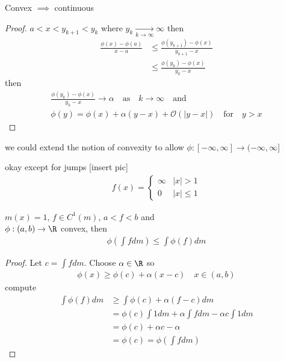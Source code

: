 \begin{lemma}
	Convex $\implies$ continuous
\end{lemma}

\begin{proof}
	$a < x < y_{k+1} < y_{k}$ where $y_{k} \xrightarrow[k \to \infty]{} \infty$ then
	\begin{align*}
		\frac{\phi(x) - \phi(a)}{x - a} &\leq \frac{\phi(y_{k+1}) - \phi (x)}{y_{k+1} - x} \\
										&\leq \frac{\phi(y_{k}) - \phi(x)}{y_{k} - x}
	\end{align*} then
	\begin{align*}
		\frac{\phi(y_{k}) - \phi(x)}{y_{k} - x} \to \alpha \quad \text{as} \quad k \to \infty \quad \text{and} \\
		\phi(y) = \phi(x) + \alpha (y - x) + \mathcal{O}( | y -x|) \quad \text{for} \quad y > x
	\end{align*}
\end{proof}

\begin{remark}
	we could extend the notion of convexity to allow $\phi : [-\infty, \infty] \to (-\infty, \infty]$
	\begin{lemma}
		okay except for jumps [insert pic]
		\begin{align*}
			f(x) =
			\begin{cases}
				\infty & |x| > 1 \\
				0 &|x| \leq 1
			\end{cases}
		\end{align*}
	\end{lemma}

\end{remark}

\begin{theorem}
	$m(x) = 1$, $f \in C^{1}(m)$, $a < f < b$ and \\
	$\phi : (a,b) \to \R$ convex, then
	\begin{align*}
		\phi\left(\int f dm \right) \leq \int \phi(f) dm
	\end{align*}
\end{theorem}

\begin{proof}
	Let $c = \int f dm$. Choose $\alpha \in \R$ so
	\begin{align*}
		\phi (x) \geq \phi (c) + \alpha (x - c) \quad x \in (a,b)
	\end{align*}
	compute
	\begin{align*}
		\int \phi (f) dm &\geq \int \phi (c) + \alpha (f -c) dm \\
						 &= \phi (c) \int 1 dm + \alpha \int f dm - \alpha c \int 1 dm \\
						 &= \phi (c) + \alpha c - \alpha \\
						 &= \phi (c) = \phi \left( \int f dm \right)
	\end{align*}
\end{proof}

